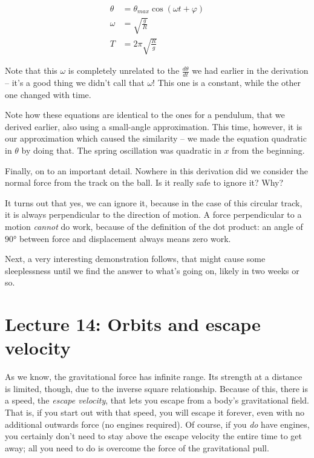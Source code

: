 \begin{align}
\theta &= \theta_{max} \cos (\omega t + \varphi)\\
\omega &= \sqrt{\frac{g}{R}}\\
T      &= 2 \pi \sqrt{\frac{R}{g}}
\end{align}

Note that this $\omega$ is completely unrelated to the $\displaystyle \frac{d\theta}{dt}$ we had earlier in the derivation -- it's a good thing we didn't call that $\omega$! This one is a constant, while the other one changed with time.

Note how these equations are identical to the ones for a pendulum, that we derived earlier, also using a small-angle approximation. This time, however, it is our approximation which caused the similarity -- we made the equation quadratic in $\theta$ by doing that. The spring oscillation was quadratic in $x$ from the beginning.

Finally, on to an important detail. Nowhere in this derivation did we consider the normal force from the track on the ball. Is it really safe to ignore it? Why?

It turns out that yes, we can ignore it, because in the case of this circular track, it is always perpendicular to the direction of motion. A force perpendicular to a motion \emph{cannot} do work, because of the definition of the dot product: an angle of $\ang{90}$ between force and displacement always means zero work.

Next, a very interesting demonstration follows, that might cause some sleeplessness until we find the answer to what's going on, likely in two weeks or so.

\section{Lecture 14: Orbits and escape velocity}

As we know, the gravitational force has infinite range. Its strength at a distance is limited, though, due to the inverse square relationship. Because of this, there is a speed, the \emph{escape velocity}, that lets you escape from a body's gravitational field. That is, if you start out with that speed, you will escape it forever, even with no additional outwards force (no engines required). Of course, if you \emph{do} have engines, you certainly don't need to stay above the escape velocity the entire time to get away; all you need to do is overcome the force of the gravitational pull.

